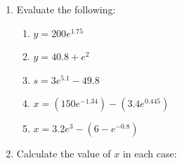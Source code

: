 \documentclass[
  12pt,
  oneside]{book}
\providecommand{\tightlist}{%
  \setlength{\itemsep}{0pt}\setlength{\parskip}{0pt}}
\theoremstyle{definition}
\theoremstyle{definition}
\theoremstyle{definition}
\theoremstyle{definition}
\theoremstyle{remark}
\begin{document}
\begin{enumerate}
\def\labelenumi{\arabic{enumi}.}
\item
  Evaluate the following:

  \begin{enumerate}
  \def\labelenumii{\roman{enumii})}
  \tightlist
  \item
    \(y=200e^{1.75}\)
  \item
    \(y=40.8+e^2\)
  \item
    \(s=3e^{5.1}-49.8\)
  \item
    \(x=(150e^{-1.34})-(3.4e^{0.445})\)
  \item
    \(x=3.2e^3 - (6-e^{-0.8})\)
  \end{enumerate}
\item
  Calculate the value of \(x\) in each case:


\end{enumerate}
\end{document}
